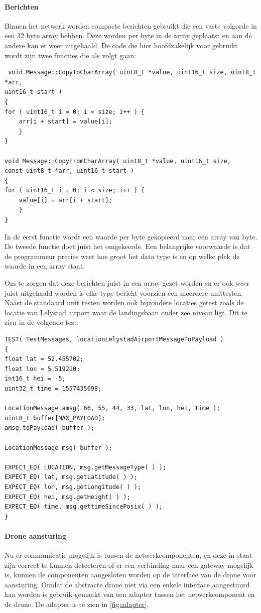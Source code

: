 \documentclass[a4paper, 11pt, oneside]{report}
\begin{document}
\paragraph{Berichten}
Binnen het netwerk worden compacte berichten gebruikt die een vaste volgorde in een 32 byte array hebben.
Deze worden per byte in de array geplaatst en aan de andere kan er weer uitgehaald.
De code die hier hoofdzakelijk voor gebruikt wordt zijn twee functies die als volgt gaan:
\begin{lstlisting}
 void Message::CopyToCharArray( uint8_t *value, uint16_t size, uint8_t *arr,
uint16_t start )
{
for ( uint16_t i = 0; i < size; i++ ) {
	arr[i + start] = value[i];
	}
}

void Message::CopyFromCharArray( uint8_t *value, uint16_t size,
const uint8_t *arr, uint16_t start )
{
for ( uint16_t i = 0; i < size; i++ ) {
	value[i] = arr[i + start];
	}
}
\end{lstlisting}
In de eerst functie wordt een waarde per byte gekopieerd naar een array van byte.
De tweede functie doet juist het omgekeerde.
Een belangrijke voorwaarde is dat de programmeur precies weet hoe groot het data type is en op welke plek de waarde in een array staat. 


Om te zorgen dat deze berichten juist in een array gezet worden en er ook weer juist uitgehaald worden is elke type bericht voorzien een meerdere unittesten.
Naast de standaard unit testen worden ook bijzondere locaties getest zoals de locatie van Lelystad airport waar de landingsbaan onder zee niveau ligt.
Dit te zien in de volgende test:
\begin{lstlisting}
TEST( TestMessages, locationLelystadAirportMessageToPayload )
{
float lat = 52.455702;
float lon = 5.519210;
int16_t hei = -5;
uint32_t time = 1557435698;

LocationMessage amsg( 66, 55, 44, 33, lat, lon, hei, time );
uint8_t buffer[MAX_PAYLOAD];
amsg.toPayload( buffer );

LocationMessage msg( buffer );

EXPECT_EQ( LOCATION, msg.getMessageType( ) );
EXPECT_EQ( lat, msg.getLatitude( ) );
EXPECT_EQ( lon, msg.getLongitude( ) );
EXPECT_EQ( hei, msg.getHeight( ) );
EXPECT_EQ( time, msg.gettimeSincePosix( ) );
}
\end{lstlisting}

\paragraph{Drone aansturing}
Nu er communicatie mogelijk is tussen de netwerkcomponenten, en deze in staat zijn correct te kunnen detecteren of er een verbinding naar een gateway mogelijk is, kunnen de componenten aangesloten worden op de interface van de drone voor aansturing.
Omdat de abstracte drone niet via een enkele interface aangestuurd kan worden is gebruik gemaakt van een adapter \cite{adapter} tussen het netwerkcomponent en de drone. 
De adapter is te zien in \autoref{fig:adapter}.
\end{document}

